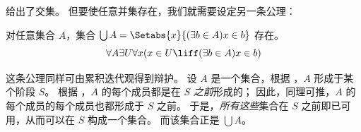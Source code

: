 \documentclass[../../../include/open-logic-section]{subfiles}
\begin{document}

 给出了交集。
但要使任意并集存在，我们就需要设定另一条公理：

\begin{axiom}[并集]
对任意集合 $A$，集合 $\bigcup A =
\Setabs{x}{(\exists b \in A) x \in b}$ 存在。
\[
	\forall A \exists U \forall x(x \in U \liff (\exists b \in A)x \in b)
\]
\end{axiom}

这条公理同样可由累积迭代观得到辩护。
设 $A$ 是一个集合，根据 \stageshier，$A$ 形成于某个阶段 $S$。
根据 \stagesacc，$A$ 的每个成员都是在 $S$ \emph{之前}形成的；
因此，同理可推，$A$ 的每个成员的每个成员也都形成于 $S$ 之前。
于是，\emph{所有这些}集合在 $S$ 之前即已可用，从而可以在 $S$ 构成一个集合。
而该集合正是 $\bigcup A$。
\end{document}
